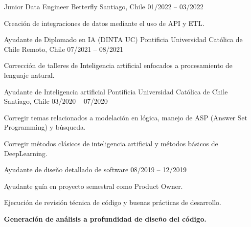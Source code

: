 

\begin{cventries}
\cventry
  {Junior Data Engineer} %
  {Betterfly} %
  {Santiago, Chile} %
  {01/2022 – 03/2022} %
  {
    \begin{cvitems} %
      \item {Creación de integraciones de datos mediante el uso de API y ETL.}
    \end{cvitems}
  }
\cventry
  {Ayudante de Diplomado en IA (DINTA UC)} %
  {Pontificia Universidad Católica de Chile} %
  {Remoto, Chile} %
  {07/2021 – 08/2021} %
  {
    \begin{cvitems} %
      \item {Corrección de talleres de Inteligencia artificial enfocados a procesamiento de lenguaje natural.}
    \end{cvitems}
  }
  \cventry
    {Ayudante de Inteligencia artificial} %
    {Pontificia Universidad Católica de Chile} %
    {Santiago, Chile} %
    {03/2020 – 07/2020} %
    {
      \begin{cvitems} %
        \item {Corregir temas relacionados a modelación en lógica, manejo de ASP (Answer Set Programming) y búsqueda.}
        \item {Corregir métodos clásicos de inteligencia artificial y métodos básicos de DeepLearning.}
      \end{cvitems}
    }

  \cventry
    {Ayudante de diseño detallado de software} %
    {} %
    {} %
    {08/2019 – 12/2019} %
    {
      \begin{cvitems} %
        \item {Ayudante guía en proyecto semestral como Product Owner.}
        \item {Ejecución de revisión técnica de código y buenas prácticas de desarrollo.}
        \item {\textbf{Generación de análisis a profundidad de diseño del código.}}
      \end{cvitems}
    }


\end{cventries}
